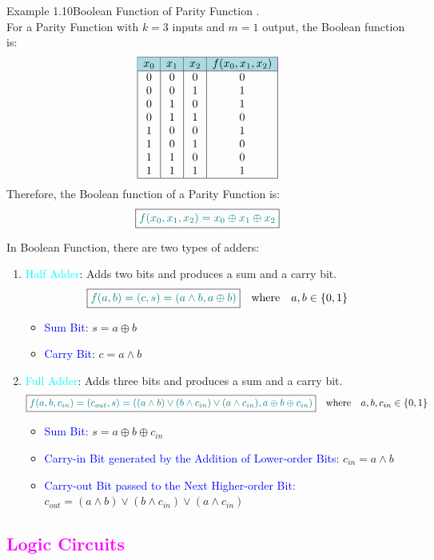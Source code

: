 \documentclass{book}
\begin{document}
\begin{egBox}{Example 1.10}{Boolean Function of Parity Function}
    .\\
    \vspace{0.2cm}
    For a Parity Function with $k=3$ inputs and $m=1$ output, the Boolean function is:
    \[
    \begin{array}{|c|c|c|c|}
        \hline
        \rowcolor{lightblue}
        $$x_0$$ & $$x_1$$ & $$x_2$$ & $$f(x_0, x_1, x_2)$$\\
        \hline
        0 & 0 & 0 & 0\\
        0 & 0 & 1 & 1\\
        0 & 1 & 0 & 1\\
        0 & 1 & 1 & 0\\
        1 & 0 & 0 & 1\\
        1 & 0 & 1 & 0\\
        1 & 1 & 0 & 0\\
        1 & 1 & 1 & 1\\
        \hline
    \end{array}
    \]
    Therefore, the Boolean function of a Parity Function is:
    \[
    \boxed{\textcolor{teal}{f(x_0, x_1, x_2) = x_0 \oplus x_1 \oplus x_2}}
    \]
\end{egBox}
In Boolean Function, there are two types of adders:
\begin{enumerate}
    \item \textcolor{cyan}{Half Adder}: Adds two bits and produces a sum and a carry bit.
    \[
        \boxed{\textcolor{teal}{f(a,b) = (c, s) = (a \land b, a \oplus b)}} \quad \text{where} \quad a, b \in \{0, 1\}
    \]
    \begin{itemize}
        \item \textcolor{blue}{Sum Bit}: \(s = a \oplus b\)
        \item \textcolor{blue}{Carry Bit}: \(c = a \land b\)
    \end{itemize}
    \item \textcolor{cyan}{Full Adder}: Adds three bits and produces a sum and a carry bit.
    \[
        \boxed{\textcolor{teal}{f(a,b,c_{in}) = (c_{out}, s) = ((a \land b) \lor (b \land c_{in}) \lor (a \land c_{in}), a \oplus b \oplus c_{in})}} \quad \text{where} \quad a, b, c_{in} \in \{0, 1\}
    \]
    \begin{itemize}
        \item \textcolor{blue}{Sum Bit}: \(s = a \oplus b \oplus c_{in}\)
        \item \textcolor{blue}{Carry-in Bit generated by the Addition of Lower-order Bits}: \(c_{in} = a \land b\)
        \item \textcolor{blue}{Carry-out Bit passed to the Next Higher-order Bit}: \(c_{out} = (a \land b) \lor (b \land c_{in}) \lor (a \land c_{in})\)
    \end{itemize}
\end{enumerate}
\newpage
\textcolor{magenta}{\section{\textbf{Logic Circuits}}}
\end{document}
